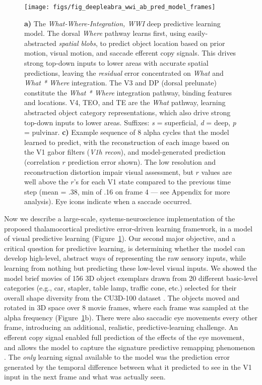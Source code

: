 \documentclass[11pt,twoside]{article}
\newif\myifpdf
\begin{document}
\begin{figure}
  \centering\texttt{[image: figs/fig\_deepleabra\_wwi\_ab\_pred\_model\_frames]}
  \caption{\footnotesize {\bf a)} The \emph{What-Where-Integration, WWI} deep predictive learning model. The dorsal \emph{Where} pathway learns first, using easily-abstracted \emph{spatial blobs}, to predict object location based on prior motion, visual motion, and saccade efferent copy signals.  This drives strong top-down inputs to lower areas with accurate spatial predictions, leaving the \emph{residual} error concentrated on \emph{What} and \emph{What * Where} integration.  The V3 and DP (dorsal prelunate) constitute the \emph{What * Where} integration pathway, binding features and locations.  V4, TEO, and TE are the \emph{What} pathway, learning abstracted object category representations, which also drive strong top-down inputs to lower areas.  Suffixes: \emph{s} = superficial, \emph{d} = deep, \emph{p} = pulvinar. {\bf c)} Example sequence of 8 alpha cycles that the model learned to predict, with the reconstruction of each image based on the V1 gabor filters (\emph{V1h recon}), and model-generated prediction (correlation $r$ prediction error shown).  The low resolution and reconstruction distortion impair visual assessment, but $r$ values are well above the $r$'s for each V1 state compared to the previous time step (mean = .38, min of .16 on frame 4 --- see Appendix for more analysis).  Eye icons indicate when a saccade occurred.}
  \label{fig.model}
\end{figure}

Now we describe a large-scale, systems-neuroscience implementation of the proposed thalamocortical predictive error-driven learning framework, in a model of visual predictive learning (Figure~\ref{fig.model}).  Our second major objective, and a critical question for predictive learning, is determining whether the model can develop high-level, abstract ways of representing the raw sensory inputs, while learning from nothing but predicting these low-level visual inputs.  We showed the model brief movies of 156 3D object exemplars drawn from 20 different basic-level categories (e.g., car, stapler, table lamp, traffic cone, etc.) selected for their overall shape diversity from the CU3D-100 dataset \citep{OReillyWyatteHerdEtAl13}.  The objects moved and rotated in 3D space over 8 movie frames, where each frame was sampled at the alpha frequency (Figure~\ref{fig.model}b).  There were also saccadic eye movements every other frame, introducing an additional, realistic, predictive-learning challenge.  An efferent copy signal enabled full prediction of the effects of the eye movement, and allows the model to capture the signature predictive remapping phenomenon \citep{DuhamelColbyGoldberg92,CavanaghHuntAfrazEtAl10,NeupaneGuittonPack17}.  The \emph{only} learning signal available to the model was the prediction error generated by the temporal difference between what it predicted to see in the V1 input in the next frame and what was actually seen.
\end{document}
